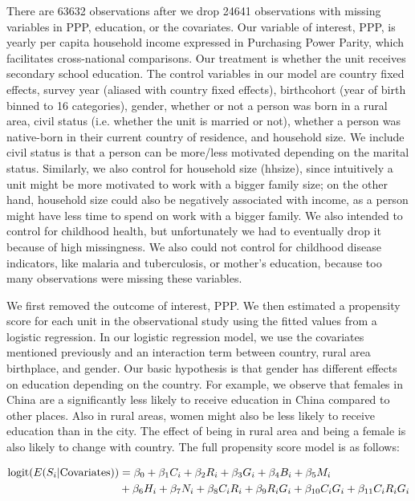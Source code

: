 \documentclass[letterpaper,11pt]{article}
\newcommand{\logit}{\textnormal{logit}}
\begin{document}
There are 63632 observations after we drop 24641 observations with missing
variables in PPP, education, or the covariates. Our variable of interest, PPP,
is yearly per capita household income expressed in Purchasing Power Parity,
which facilitates cross-national comparisons. Our treatment is whether the unit
receives secondary school education.  The control variables in our model are
country fixed effects, survey year (aliased with country fixed effects),
birthcohort (year of birth binned to 16 categories), gender, whether or not a
person was born in a rural area, civil status (i.e. whether the unit is married
or not), whether a person was native-born in their current country of residence,
and household size. We include civil status is that a person can be more/less
motivated depending on the marital status. Similarly, we also control for
household size (hhsize), since intuitively a unit might be more motivated to
work with a bigger family size; on the other hand, household size could also be
negatively associated with income, as a person might have less time to spend on
work with a bigger family. We also intended to control for childhood health, but
unfortunately we had to eventually drop it because of high missingness. We also
could not control for childhood disease indicators, like malaria and
tuberculosis, or mother's education, because too many observations were missing
these variables.

We first removed the outcome of interest, PPP. We then estimated a propensity
score for each unit in the observational study using the fitted values from a
logistic regression. In our logistic regression model, we use the covariates
mentioned previously and an interaction term between country, rural area
birthplace, and gender. Our basic hypothesis is that gender has different
effects on education depending on the country.  For example, we observe that
females in China are a significantly less likely to receive education in China
compared to other places. Also in rural areas, women might also be less likely
to receive education than in the city. The effect of being in rural area and
being a female is also likely to change with country. The full propensity score
model is as follows:

\begin{equation}
\begin{aligned}
    \logit(E(S_{i}|\textnormal{Covariates})) &
    =\beta_{0}+\beta_{1}C_{i}+\beta_{2}R_{i}+\beta_{3}G_{i}+\beta_{4}B_{i}+\beta_{5}M_{i}\\
    & +\beta_{6}H_{i}+\beta_{7}N_{i}+\beta_{8}C_{i}R_{i}+\beta_{9}R_{i}G_{i}+\beta_{10}C_{i}G_{i}+\beta_{11}C_{i}R_{i}G_{i}
\end{aligned}
\end{equation}
\end{document}

